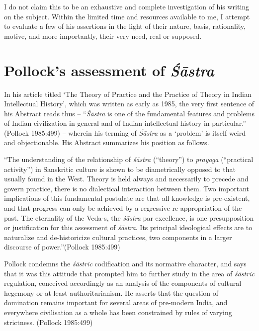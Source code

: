 I do not claim this to be an exhaustive and complete investigation of his writing on the subject. Within the limited time and resources available to me, I attempt to evaluate a few of his assertions in the light of their nature, basis, rationality, motive, and more importantly, their very need, real or supposed.

\vskip -12pt

\section*{Pollock's assessment of {\sl\bfseries Śāstra}}

In his article titled `The Theory of Practice and the Practice of Theory in Indian Intellectual History', which was written as early as 1985, the very first sentence of his Abstract reads thus -- ``{\it Śāstra} is one of the fundamental features and problems of Indian civilization in general and of Indian intellectual history in particular.'' (Pollock 1985:499) -- wherein his terming of {\it Śāstra} as a `problem'  is itself weird and objectionable. His Abstract summarizes his position as follows.
\begin{myquote}
``The understanding of the relationship of {\sl śāstra} (``theory'') to {\sl prayoga}  (``practical activity'') in Sanskritic culture is shown to be diametrically opposed to that usually found in the West. Theory is held always and necessarily to precede and govern practice, there is no dialectical interaction between them. Two important implications of this fundamental postulate are that all knowledge is pre-existent, and that progress can only be achieved by a regressive re-appropriation of the past. The eternality of the Veda-s, the {\sl śāstra} par excellence, is one presupposition or justification for this assessment of {\sl śāstra}. Its principal ideological effects are to naturalize and de-historicize cultural practices, two components in a larger discourse of power.''\hfill (Pollock 1985:499)
\end{myquote}
 
Pollock condemns the {\sl śāstric} codification and its normative character, and says that it was this attitude that prompted him to further study in the area of {\sl śāstric} regulation, conceived accordingly as an analysis of the components of cultural hegemony or at least authoritarianism. He asserts that the question of domination remains important for several areas of pre-modern India, and everywhere civilisation as a whole has been constrained by rules of varying strictness. (Pollock 1985:499)

